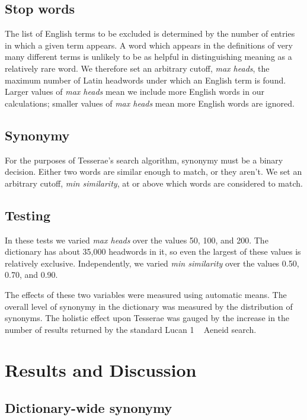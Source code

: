 \documentclass[]{article}
\begin{document}
	\subsection{Stop words}
	
		The list of English terms to be excluded is determined by the number of entries in which a given term appears.  A word which appears in the definitions of very many different terms is unlikely to be as helpful in distinguishing meaning as a relatively rare word.  We therefore set an arbitrary cutoff, \emph{max heads}, the maximum number of Latin headwords under which an English term is found.  Larger values of \emph{max heads} mean we include more English words in our calculations; smaller values of \emph{max heads} mean more English words are ignored.
		
	\subsection{Synonymy}
	
		For the purposes of Tesserae's search algorithm, synonymy must be a binary decision.  Either two words are similar enough to match, or they aren't.  We set an arbitrary cutoff, \emph{min similarity}, at or above which words are considered to match.
		
	
	\subsection{Testing}
	
	In these tests we varied \emph{max heads} over the values 50, 100, and 200.  The dictionary has about 35,000 headwords in it, so even the largest of these values is relatively exclusive.  Independently, we varied \emph{min similarity} over the values 0.50, 0.70, and 0.90.
	
	The effects of these two variables were measured using automatic means.  The overall level of synonymy in the dictionary was measured by the distribution of synonyms.  The holistic effect upon Tesserae was gauged by the increase in the number of results returned by the standard Lucan 1 ~ Aeneid search.
		
	\section{Results and Discussion}
	
	\subsection{Dictionary-wide synonymy}
	
\end{document}
